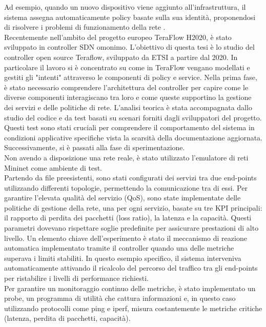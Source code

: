 Ad esempio, quando un nuovo dispositivo viene aggiunto all'infrastruttura, 
il sistema assegna automaticamente policy basate sulla sua identità, proponendosi di risolvere i problemi di funzionamento della rete \cite{qoe}.
\\Recentemente nell'ambito del progetto europeo TeraFlow H2020, è stato sviluppato in controller SDN omonimo. 
L'obiettivo di questa tesi è lo studio del controller open source Teraflow, sviluppato da ETSI \cite{etsi} a partire dal 2020.
In particolare il lavoro si è concentrato su come in TeraFlow vengano modellati e gestiti gli "intenti" attraverso le componenti di policy e service.
Nella prima fase, è stato necessario comprendere l'architettura del controller per capire come le diverse componenti interagiscano tra loro e come queste supportino la gestione dei servizi e delle politiche di rete.
L'analisi teorica è stata accompagnata dallo studio del codice e da test basati su scenari forniti dagli sviluppatori del progetto. 
Questi test sono stati cruciali per comprendere il comportamento del sistema in condizioni applicative specifiche vista la scarsità della documentazione aggiornata.
Successivamente, si è passati alla fase di sperimentazione.
\\Non avendo a disposizione una rete reale, è stato utilizzato l'emulatore di reti Mininet come ambiente di test.
\\Partendo da file preesistenti, sono stati configurati dei servizi tra due end-points utilizzando differenti topologie, permettendo la comunicazione tra di essi. 
Per garantire l'elevata qualità del servizio (QoS), sono state implementate delle politiche di 
gestione della rete, una per ogni servizio, basate su tre KPI principali: il rapporto di perdita dei pacchetti (loss ratio), la latenza e la capacità. 
Questi parametri dovevano rispettare soglie predefinite per assicurare prestazioni di alto livello.
Un elemento chiave dell'esperimento è stato il meccanismo di reazione automatica implementato tramite il controller quando una delle metriche superava i limiti stabiliti.
In questo esempio specifico, il sistema interveniva automaticamente attivando il ricalcolo del percorso del traffico tra gli end-points per ristabilire i livelli di performance richiesti. 
\\Per garantire un monitoraggio continuo delle metriche, è stato implementato un probe, un programma di utilità che cattura informazioni e, in questo caso 
utilizzando protocolli come ping e iperf, misura costantemente le metriche critiche (latenza, perdita di pacchetti, capacità). 
